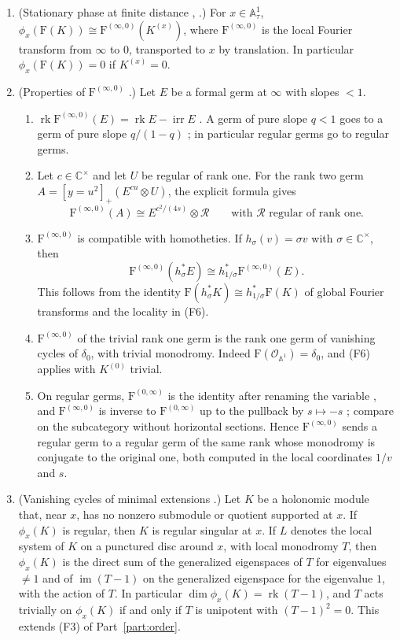 \documentclass[11pt,a4paper]{article}
\theoremstyle{definition}
\theoremstyle{remark}
\numberwithin{equation}{section}
\newcommand{\C}{\mathbb{C}}
\newcommand{\A}{\mathbb{A}}
\newcommand{\cO}{\mathcal{O}}
\newcommand{\Four}{\mathrm{F}}
\DeclareMathOperator{\rk}{rk}
\DeclareMathOperator{\im}{im}
\DeclareMathOperator{\irr}{irr}
\begin{document}
\begin{enumerate}
\item[(F6)] (Stationary phase at finite distance \cite[Cor.~2.3(1)]{Ari08}, \cite[Prop.~2.1]{GL04}.) For $x\in\A^1_\tau$, $\phi_x(\Four(K))\cong\Four^{(\infty,0)}(K^{(x)})$, where $\Four^{(\infty,0)}$ is the local Fourier transform from $\infty$ to $0$, transported to $x$ by translation. In particular $\phi_x(\Four(K))=0$ if $K^{(x)}=0$.
\item[(F7)] (Properties of $\Four^{(\infty,0)}$ \cite{BE04,Sab08,GS10}.) Let $E$ be a formal germ at $\infty$ with slopes $<1$.
\begin{enumerate}
\item[(a)] $\rk\Four^{(\infty,0)}(E)=\rk E-\irr E$ \cite[Prop.~3.14]{BE04}. A germ of pure slope $q<1$ goes to a germ of pure slope $q/(1-q)$ \cite[Thm.~3.3]{GS10}; in particular regular germs go to regular germs.
\item[(b)] Let $c\in\C^\times$ and let $U$ be regular of rank one. For the rank two germ $A=[y=u^2]_+(E^{cu}\otimes U)$, the explicit formula \cite[(5.4)]{Sab08} gives
\[
\Four^{(\infty,0)}(A)\cong E^{c^2/(4s)}\otimes\mathcal R\qquad\text{with $\mathcal R$ regular of rank one.}
\]
\item[(c)] $\Four^{(\infty,0)}$ is compatible with homotheties. If $h_\sigma(v)=\sigma v$ with $\sigma\in\C^\times$, then
\[
\Four^{(\infty,0)}(h_\sigma^*E)\cong h_{1/\sigma}^*\Four^{(\infty,0)}(E).
\]
This follows from the identity $\Four(h_\sigma^*K)\cong h_{1/\sigma}^*\Four(K)$ of global Fourier transforms and the locality in (F6).
\item[(d)] $\Four^{(\infty,0)}$ of the trivial rank one germ is the rank one germ of vanishing cycles of $\delta_0$, with trivial monodromy. Indeed $\Four(\cO_{\A^1})=\delta_0$, and (F6) applies with $K^{(0)}$ trivial.
\item[(e)] On regular germs, $\Four^{(0,\infty)}$ is the identity after renaming the variable \cite[Rem.~5.2]{Sab08}, and $\Four^{(\infty,0)}$ is inverse to $\Four^{(0,\infty)}$ up to the pullback by $s\mapsto-s$ \cite[Rem.~5.3(4)]{Sab08}; compare \cite[Prop.~3.10]{BE04} on the subcategory without horizontal sections. Hence $\Four^{(\infty,0)}$ sends a regular germ to a regular germ of the same rank whose monodromy is conjugate to the original one, both computed in the local coordinates $1/v$ and $s$.
\end{enumerate}
\item[(F8)] (Vanishing cycles of minimal extensions \cite[\S3.3]{Ari08}.) Let $K$ be a holonomic module that, near $x$, has no nonzero submodule or quotient supported at $x$. If $\phi_x(K)$ is regular, then $K$ is regular singular at $x$. If $L$ denotes the local system of $K$ on a punctured disc around $x$, with local monodromy $T$, then $\phi_x(K)$ is the direct sum of the generalized eigenspaces of $T$ for eigenvalues $\ne1$ and of $\im(T-1)$ on the generalized eigenspace for the eigenvalue $1$, with the action of $T$. In particular $\dim\phi_x(K)=\rk(T-1)$, and $T$ acts trivially on $\phi_x(K)$ if and only if $T$ is unipotent with $(T-1)^2=0$. This extends (F3) of Part~\ref{part:order}.
\end{enumerate}
\end{document}
